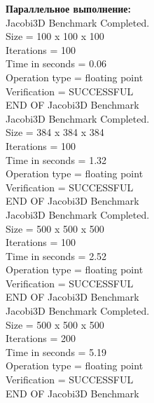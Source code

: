 \documentclass[a4paper,12pt,titlepage,draft]{article}
\begin{document}
\begin{minipage}{.45\textwidth}
\textbf{Параллельное выполнение:}\\

 Jacobi3D Benchmark Completed.\\
 Size            =  100 x  100 x  100\\
 Iterations      =                100\\
 Time in seconds =               0.06\\
 Operation type  =     floating point\\
 Verification    =         SUCCESSFUL\\
 END OF Jacobi3D Benchmark\\

Jacobi3D Benchmark Completed.\\
 Size            =  384 x  384 x  384\\
 Iterations      =                100\\
 Time in seconds =               1.32\\
 Operation type  =     floating point\\
 Verification    =         SUCCESSFUL\\
 END OF Jacobi3D Benchmark\\

 Jacobi3D Benchmark Completed.\\
 Size            =  500 x  500 x  500\\
 Iterations      =                100\\
 Time in seconds =               2.52\\
 Operation type  =     floating point\\
 Verification    =         SUCCESSFUL\\
 END OF Jacobi3D Benchmark\\

 Jacobi3D Benchmark Completed.\\
 Size            =  500 x  500 x  500\\
 Iterations      =                200\\
 Time in seconds =               5.19\\
 Operation type  =     floating point\\
 Verification    =         SUCCESSFUL\\
 END OF Jacobi3D Benchmark\\

\end{minipage}
\end{document}
